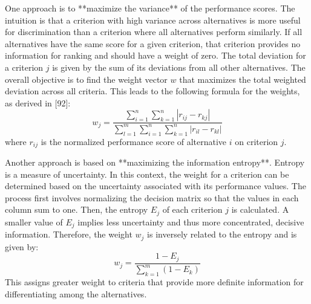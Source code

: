 One approach is to **maximize the variance** of the performance scores. The intuition is that a criterion with high variance across alternatives is more useful for discrimination than a criterion where all alternatives perform similarly. If all alternatives have the same score for a given criterion, that criterion provides no information for ranking and should have a weight of zero. The total deviation for a criterion $j$ is given by the sum of its deviations from all other alternatives. The overall objective is to find the weight vector $w$ that maximizes the total weighted deviation across all criteria. This leads to the following formula for the weights, as derived in [92]:
\begin{equation}
    w_j = \frac{\sum_{i=1}^{n}\sum_{k=1}^{n} |r_{ij} - r_{kj}|}{\sum_{l=1}^{m}\sum_{i=1}^{n}\sum_{k=1}^{n} |r_{il} - r_{kl}|}
\end{equation}
where $r_{ij}$ is the normalized performance score of alternative $i$ on criterion $j$.

Another approach is based on **maximizing the information entropy**. Entropy is a measure of uncertainty. In this context, the weight for a criterion can be determined based on the uncertainty associated with its performance values. The process first involves normalizing the decision matrix so that the values in each column sum to one. Then, the entropy $E_j$ of each criterion $j$ is calculated. A smaller value of $E_j$ implies less uncertainty and thus more concentrated, decisive information. Therefore, the weight $w_j$ is inversely related to the entropy and is given by:
\begin{equation}
    w_j = \frac{1 - E_j}{\sum_{k=1}^{m}(1-E_k)}
\end{equation}
This assigns greater weight to criteria that provide more definite information for differentiating among the alternatives.